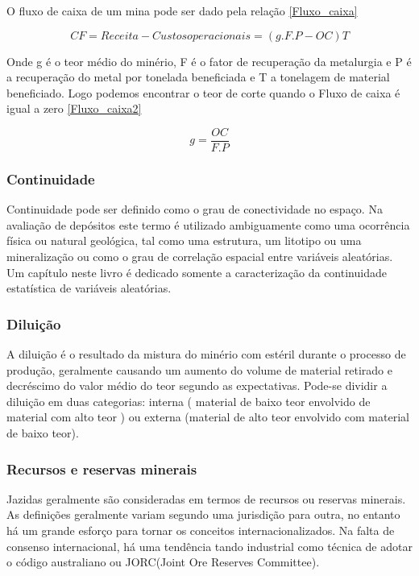 O fluxo de caixa de um mina pode ser dado pela relação \eqref{Fluxo_caixa}

\begin{equation}\label{Fluxo_caixa}
CF = Receita - Custos operacionais = (g.F.P-OC)T
\end{equation}

Onde g é o teor médio do minério, F é o fator de recuperação da metalurgia e P é a recuperação do metal por tonelada beneficiada e T a tonelagem de material beneficiado. Logo podemos encontrar o teor de corte quando o Fluxo de caixa é igual a zero \eqref{Fluxo_caixa2} 

\begin{equation}\label{Fluxo_caixa2}
g = \frac{OC}{F.P}
\end{equation} 

\subsubsection{Continuidade}

Continuidade pode ser definido como o grau de conectividade no espaço. Na avaliação de depósitos este termo é utilizado ambiguamente como uma ocorrência física ou natural geológica, tal como uma estrutura, um litotipo ou uma mineralização ou como o grau de correlação espacial entre variáveis aleatórias. Um capítulo neste livro é dedicado somente a caracterização da continuidade estatística de variáveis aleatórias.

\subsubsection{Diluição}

A diluição é o resultado da mistura do minério com estéril durante o processo de produção, geralmente causando um aumento do volume de material retirado e decréscimo do valor médio do teor segundo as expectativas. Pode-se dividir a diluição em duas categorias: interna ( material de baixo teor envolvido de material com alto teor ) ou externa (material de alto teor envolvido com material de baixo teor). 

\subsubsection{Recursos e reservas minerais}

Jazidas geralmente são consideradas em termos de recursos ou reservas minerais. As definições geralmente variam segundo uma jurisdição para outra, no entanto há um grande esforço para tornar os conceitos internacionalizados. Na falta de consenso internacional, há uma tendência tando industrial como técnica de adotar o código australiano ou JORC(Joint Ore Reserves Committee).

